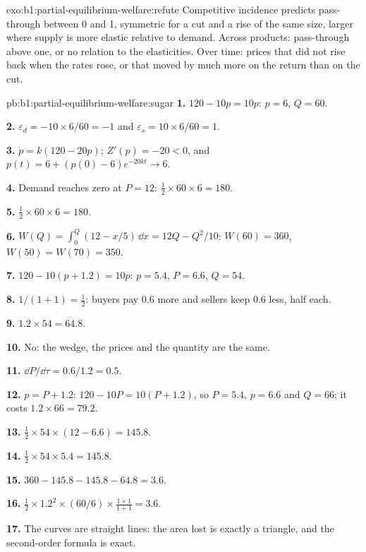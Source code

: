 \begin{solution}{exo:b1:partial-equilibrium-welfare:refute}
Competitive incidence predicts pass-through between 0 and 1, symmetric for
a cut and a rise of the same size, larger where supply is more elastic
relative to demand. Across products: pass-through above one, or no
relation to the elasticities. Over time: prices that did not rise back
when the rates rose, or that moved by much more on the return than on the
cut.
\end{solution}

\begin{solution}{pb:b1:partial-equilibrium-welfare:sugar}
\textbf{1.} $120 - 10p = 10p$: $p = 6$, $Q = 60$.

\textbf{2.} $\varepsilon_d = -10 \times 6/60 = -1$ and $\varepsilon_s = 10 \times 6/60 = 1$.

\textbf{3.} $\dot p = k(120 - 20p)$; $Z'(p) = -20 < 0$, and
$p(t) = 6 + (p(0) - 6)e^{-20kt} \to 6$.

\textbf{4.} Demand reaches zero at $P = 12$: $\tfrac12 \times 60 \times 6 = 180$.

\textbf{5.} $\tfrac12 \times 60 \times 6 = 180$.

\textbf{6.} $W(Q) = \int_0^Q(12 - x/5)\,\dd x = 12Q - Q^2/10$: $W(60) = 360$, $W(50) = W(70) = 350$.

\textbf{7.} $120 - 10(p + 1.2) = 10p$: $p = 5.4$, $P = 6.6$, $Q = 54$.

\textbf{8.} $1/(1 + 1) = \tfrac12$: buyers pay $0.6$ more and sellers keep $0.6$ less, half each.

\textbf{9.} $1.2 \times 54 = 64.8$.

\textbf{10.} No: the wedge, the prices and the quantity are the same.

\textbf{11.} $\dd P/\dd\tau = 0.6/1.2 = 0.5$.

\textbf{12.} $p = P + 1.2$: $120 - 10P = 10(P + 1.2)$, so $P = 5.4$, $p = 6.6$ and $Q = 66$; it costs
$1.2 \times 66 = 79.2$.

\textbf{13.} $\tfrac12 \times 54 \times (12 - 6.6) = 145.8$.

\textbf{14.} $\tfrac12 \times 54 \times 5.4 = 145.8$.

\textbf{15.} $360 - 145.8 - 145.8 - 64.8 = 3.6$.

\textbf{16.} $\tfrac12 \times 1.2^2 \times (60/6) \times \tfrac{1 \times 1}{1 + 1} = 3.6$.

\textbf{17.} The curves are straight lines: the area lost is exactly a
triangle, and the second-order formula is exact.


\end{solution}
